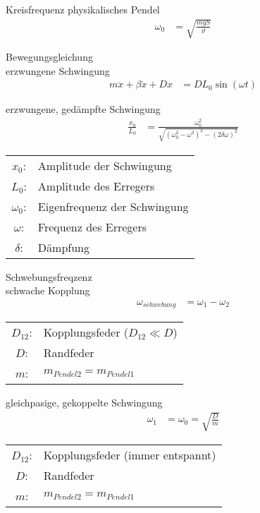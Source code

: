 \begin{karte}{Kreisfrequenz physikalisches Pendel}
    \begin{align*}
        \omega_0 &= \sqrt{ \frac{mgS}{\vartheta} }
    \end{align*}
\end{karte}

\begin{karte}{Bewegungsgleichung\\erzwungene Schwingung}
    \begin{align*}
         m \ddot x + \beta \dot x + Dx &= D L_0 \sin \left( \omega t \right) 
    \end{align*}
\end{karte}

\begin{karte}{erzwungene, gedämpfte Schwingung}
    \begin{align*}
        \frac{x_0}{L_0} &= \frac{ \omega_0^2 }{\sqrt{ \left( \omega_0^2 - \omega^2 \right)^2 - \left( 2 \delta \omega \right) ^2   }}
    \end{align*}
    \begin{tabular}[t]{cl}
        \(x_0 \): & Amplitude der Schwingung \\
        \(L_0 \): & Amplitude des Erregers \\
        \(\omega_0 \): & Eigenfrequenz der Schwingung \\
        \(\omega \): & Frequenz des Erregers \\
        \(\delta \): & Dämpfung \\
    \end{tabular}
\end{karte}

\begin{karte}{Schwebungsfreqzenz \\ schwache Kopplung}
    \begin{align*}
        \omega_{schwebung} &= \omega_1 - \omega_2
    \end{align*}
    \begin{tabular}[t]{cl}
        \( D_{12}\): & Kopplungsfeder (\(D_{12} \ll D \)) \\
        \( D\): & Randfeder \\
        \( m\): & \( m_{Pendel2} = m_{Pendel1} \)
    \end{tabular}
\end{karte}

\begin{karte}{gleichpasige, gekoppelte Schwingung}
    \begin{align*}
        \omega_1 &= \omega_0 = \sqrt{\frac{D}{m}}
    \end{align*}
    \begin{tabular}[t]{cl}
        \( D_{12}\): & Kopplungsfeder (immer entspannt) \\
        \( D\): & Randfeder \\
        \( m\): & \( m_{Pendel2} = m_{Pendel1} \)
    \end{tabular}
\end{karte}


